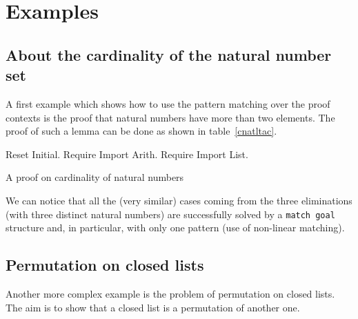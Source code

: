 
\section{Examples}

\subsection{About the cardinality of the natural number set}

A first example which shows how to use the pattern matching over the proof
contexts is the proof that natural numbers have more than two elements. The
proof of such a lemma can be done as shown in table~\ref{cnatltac}.

\begin{coq_eval}
Reset Initial.
Require Import Arith.
Require Import List.
\end{coq_eval}

\begin{table}[ht]
\noindent{}
\caption{A proof on cardinality of natural numbers}
\label{cnatltac}
\end{table}

We can notice that all the (very similar) cases coming from the three
eliminations (with three distinct natural numbers) are successfully solved by
a {\tt match goal} structure and, in particular, with only one pattern (use
of non-linear matching).

\subsection{Permutation on closed lists}

Another more complex example is the problem of permutation on closed lists. The
aim is to show that a closed list is a permutation of another one.

